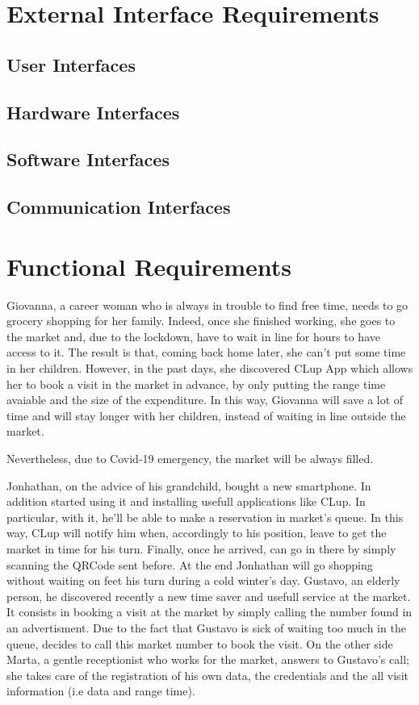 \section{External Interface Requirements}
\subsection{User Interfaces}
\subsection{Hardware Interfaces}
\subsection{Software Interfaces}
\subsection{Communication Interfaces}
\section{Functional Requirements}
Giovanna, a career woman who is always in trouble to find free time, needs to go grocery shopping for her family. 
Indeed, once she finished working, she goes to the market and, due to the lockdown, have to wait in line for hours to have access to it. The result is that, coming back home later, she can't put some time in her children.
However, in the past days, she discovered CLup App which allows her to book a visit in the market in advance, by only putting the range time avaiable and the size of the expenditure.
In this way, Giovanna will save a lot of time and will stay longer with her children, instead of waiting in line outside the market.

Nevertheless, due to Covid-19 emergency, the market will be always filled.

Jonhathan, on the advice of his grandchild, bought a new smartphone.  In addition started using it and installing usefull applications like CLup.
In particular, with it, he'll be able to make a reservation in market's queue. In this way, CLup will notify him when, accordingly to his position, leave to get the market in time for his turn.
Finally, once he arrived, can go in there by simply scanning the QRCode sent before. 
At the end Jonhathan will go shopping without waiting on feet his turn during a cold winter's day.
Gustavo, an elderly person, he discovered recently a new time saver and usefull service at the market. It consists in booking a visit at the market by simply calling the number found in an advertisment. 
Due to the fact that Gustavo is sick of waiting too much in the queue, decides to call this market number to book the visit.
On the other side Marta, a gentle receptionist who works for the market, answers to Gustavo's call; she takes care of the registration of his own data, the credentials and the all visit information (i.e data and range time).

